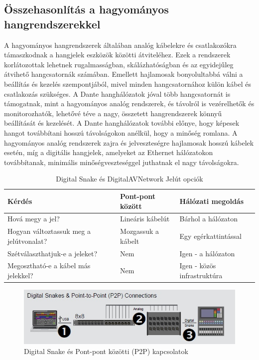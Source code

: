 \subsection{Összehasonlítás a hagyományos hangrendszerekkel}
A hagyományos hangrendszerek általában analóg kábelekre és csatlakozókra
támaszkodnak a hangjelek eszközök közötti átviteléhez. Ezek a rendszerek
korlátozottak lehetnek rugalmasságban, skálázhatóságban és az egyidejűleg
átvihető hangcsatornák számában. Emellett hajlamosak bonyolultabbá válni a
beállítás és kezelés szempontjából, mivel minden hangcsatornához külön kábel és
csatlakozás szükséges. A Dante hanghálózatok jóval több hangcsatornát is támogatnak,
mint a hagyományos analóg rendszerek, és távolról is vezérelhetők és
monitorozhatók, lehetővé téve a nagy, összetett hangrendszerek könnyű
beállítását és kezelését. A Dante hanghálózatok további előnye, hogy képesek
hangot továbbítani hosszú távolságokon anélkül, hogy a minőség romlana. A
hagyományos analóg rendszerek zajra és jelveszteségre hajlamosak hosszú kábelek
esetén, míg a digitális hangjelek, amelyeket az Ethernet hálózatokon
továbbítanak, minimális minőségveszteséggel juthatnak el nagy távolságokra.
\begin{table}[htbp]
    \centering
    \caption{Digital Snake és DigitalAVNetwork Jelút opciók}
    \begin{tabular}{@{}lll@{}}
        \toprule
        \textbf{Kérdés} & \textbf{Pont-pont között} & \textbf{Hálózati megoldás} \\ \midrule
        Hová megy a jel? & Lineáris kábelút & Bárhol a hálózaton \\
        Hogyan változtassuk meg a jelútvonalat? & Mozgassuk a kábelt & Egy egérkattintással \\
        Szétválaszthatjuk-e a jeleket? & Nem & Igen - a hálózaton \\
        Megosztható-e a kábel más jelekkel? & Nem & Igen - közös infrastruktúra \\
        \bottomrule
    \end{tabular}
    \label{tab:digital-snake-vs-digitalavnetwork-hu}
\end{table}
\begin{figure}[H]
	\centering
	\includegraphics[width=\linewidth, keepaspectratio]{figures/dsnake-p2p.jpg}
	\caption{Digital Snake és Pont-pont közötti (P2P) kapcsolatok}
	\label {fig:dsnake-p2p}
\end{figure}

